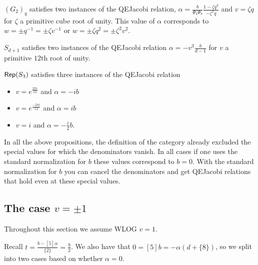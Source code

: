 \documentclass[12pt]{amsart}
\begin{document}
\begin{lemma}
$(G_2)_q$ satisfies two instances of the QEJacobi relation, $\alpha = \frac{b}{\Psi_3 \Psi_8} \frac{1-\zeta q^2}{-\zeta^2 q}$ and $v = \zeta q$ for $\zeta$ a primitive cube root of unity.  This value of $\alpha$ corresponds to $w = \pm q^{-1} = \pm \zeta v^{-1}$ or $w = \pm \zeta q^2 = \pm \zeta^2 v^2$.
\end{lemma}

\begin{lemma}
$S_{d+1}$ satisfies two instances of the QEJacobi relation $\alpha = -v^3 \frac{b}{d-1}$ for $v$ a primitive $12$th root of unity.
\end{lemma}

\begin{lemma}
$\operatorname{\mathsf{Rep}}(S_3)$ satisfies three instances of the QEJacobi relation
\begin{itemize}
\item $v = e^{\frac{2 \pi i}{12}}$ and $\alpha = -i b$
\item $v = e^{\frac{-2 \pi i}{12}}$ and $\alpha = i b$
\item $v = i$ and $\alpha = -\frac{i}{2} b$.
\end{itemize}
\end{lemma}

\begin{remark}
In all the above propositions, the definition of the category already excluded the special values for which the denominators vanish.  In all cases if one uses the standard normalization for $b$ these values correspond to $b=0$.  With the standard normalization for $b$ you can cancel the denominators and get QEJacobi relations that hold even at these special values.
\end{remark}














\subsection{The case \texorpdfstring{$v = \pm 1$}{v = pm 1}}

Throughout this section we assume WLOG $v=1$.

Recall $t = \frac{b-[5]\alpha}{\{2\}} = \frac{b}{2}$.  We also have that $0= [5]b = -\alpha (d+\{8\})$, so we split into two cases based on whether $\alpha = 0$.
\end{document}
